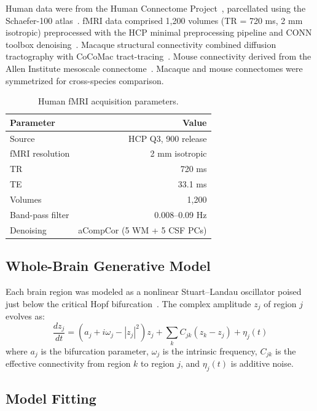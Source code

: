 \documentclass[11pt]{article}
\begin{document}
Human data were from the Human Connectome Project~\citep{vanessen2013wuminn}, parcellated using the Schaefer-100 atlas~\citep{schaefer2018local}.  fMRI data comprised 1,200 volumes (TR = 720 ms, 2 mm isotropic) preprocessed with the HCP minimal preprocessing pipeline and CONN toolbox denoising~\citep{whitfield2012conn}.  Macaque structural connectivity combined diffusion tractography with CoCoMac tract-tracing~\citep{stephan2000cocomac}.  Mouse connectivity derived from the Allen Institute mesoscale connectome~\citep{oh2014mesoscale}.  Macaque and mouse connectomes were symmetrized for cross-species comparison.

\begin{table}[ht]
\centering
\caption{Human fMRI acquisition parameters.}
\label{tab:fmri}
\begin{tabular}{@{}lr@{}}
\toprule
Parameter & Value \\
\midrule
Source & HCP Q3, 900 release \\
fMRI resolution & 2 mm isotropic \\
TR & 720 ms \\
TE & 33.1 ms \\
Volumes & 1,200 \\
Band-pass filter & 0.008--0.09 Hz \\
Denoising & aCompCor (5 WM + 5 CSF PCs) \\
\bottomrule
\end{tabular}
\end{table}

\subsection{Whole-Brain Generative Model}

Each brain region was modeled as a nonlinear Stuart--Landau oscillator poised just below the critical Hopf bifurcation~\citep{hopf1942abzweigung,deco2017dynamics}.  The complex amplitude $z_j$ of region $j$ evolves as:
\begin{equation}
\frac{dz_j}{dt} = \left(a_j + i\omega_j - |z_j|^2\right) z_j + \sum_{k} C_{jk} \left(z_k - z_j\right) + \eta_j(t)
\end{equation}
where $a_j$ is the bifurcation parameter, $\omega_j$ is the intrinsic frequency, $C_{jk}$ is the effective connectivity from region $k$ to region $j$, and $\eta_j(t)$ is additive noise.

\subsection{Model Fitting}
\end{document}
